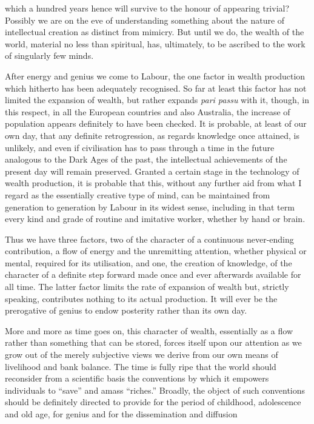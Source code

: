\documentclass[10.5pt,twoside]{book}
\newcommand{\origpage}[1]{\clearpage\setcounter{page}{#1}}
\begin{document}
\origpage{24}

\noindent which a hundred years hence will survive to the honour of appearing
trivial? Possibly we are on the eve of understanding something about the
nature of intellectual creation as distinct from mimicry. But until we do, the
wealth of the world, material no less than spiritual, has, ultimately, to be
ascribed to the work of singularly few minds.

After energy and genius we come to Labour, the one factor in wealth production
which hitherto has been adequately recognised. So far at least this factor has
not limited the expansion of wealth, but rather expands \textit{pari passu}
with it, though, in this respect, in all the European countries and also
Australia, the increase of population appears definitely to have been checked.
It is probable, at least of our own day, that any definite retrogression, as
regards knowledge once attained, is unlikely, and even if civilisation has to
pass through a time in the future analogous to the Dark Ages of the past, the
intellectual achievements of the present day will remain preserved. Granted a
certain stage in the technology of wealth production, it is probable that
this, without any further aid from what I regard as the essentially creative
type of mind, can be maintained from generation to generation by Labour in its
widest sense, including in that term every kind and grade of routine and
imitative worker, whether by hand or brain.

Thus we have three factors, two of the character of a continuous never-ending
contribution, a flow of energy and the unremitting attention, whether physical
or mental, required for its utilisation, and one, the creation of knowledge,
of the character of a definite step forward made once and ever afterwards
available for all time. The latter factor limits the rate of expansion of
wealth but, strictly speaking, contributes nothing to its actual production.
It will ever be the prerogative of genius to endow posterity rather than its
own day.

More and more as time goes on, this character of wealth, essentially as a flow
rather than something that can be stored, forces itself upon our attention as
we grow out of the merely subjective views we derive from our own means of
livelihood and bank balance. The time is fully ripe that the world should
reconsider from a scientific basis the conventions by which it empowers
individuals to ``save'' and amass ``riches.'' Broadly, the object of such
conventions should be definitely directed to provide for the period of
childhood, adolescence and old age, for genius and for the dissemination and
diffusion
\end{document}
